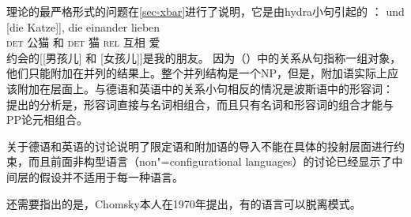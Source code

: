 \xbarc 理论的最严格形式的问题在\ref{sec-xbar}进行了说明，它是由hydra小句引起的 \citep{PR70a,Link84a-u,Kiss2005a}：
\eal
\ex {}
\gll [[der Kater] und [die Katze]], die einander lieben\\
     \spacebr{}\spacebr{}\textsc{det} 公猫 和 \textsc{det} 猫 \textsc{rel} 互相 爱\\
\ex {}约会的[[男孩儿] 和 [女孩儿]]是我的朋友。 
\zl
因为（）中的关系从句指称一组对象，他们只能附加在并列的结果上。整个并列结构是一个NP，但是，附加语实际上应该附加在\xbarc 层面上。与德语和英语中的关系小句相反的情况是波斯语中的形容词： \citet{Samvelian2007a}提出的分析是，形容词直接与名词相组合，而且只有名词和形容词的组合才能与PP论元相组合。

关于德语和英语的讨论说明了限定语和附加语的导入不能在具体的投射层面进行约束，而且前面非构型语言（non"=configurational languages）的讨论已经显示了中间层的假设并不适用于每一种语言。

还需要指出的是，Chomsky本人在1970年提出，有的语言可以脱离\xbarc 模式\citeyearpar[]{Chomsky70a}。

